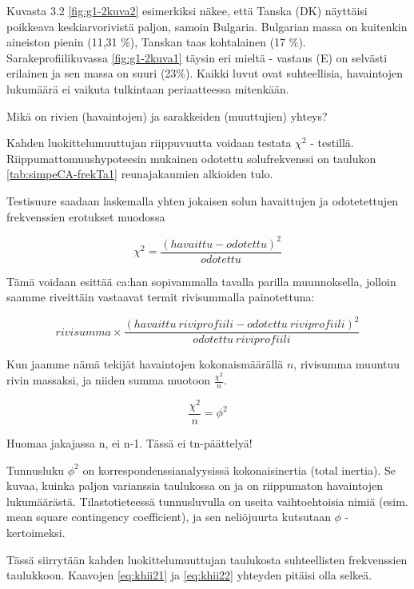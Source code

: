 \documentclass[
  finnish,
]{book}
\begin{document}
Kuvasta 3.2 \ref{fig:g1-2kuva2} esimerkiksi näkee, että Tanska (DK) näyttäisi
poikkeava keskiarvorivistä paljon, samoin Bulgaria.
Bulgarian massa on kuitenkin aineiston pienin (11,31 \%), Tanskan taas
kohtalainen (17 \%).
Sarakeprofiilikuvassa \ref{fig:g1-2kuva1} täysin eri mieltä - vastaus (E) on
selvästi erilainen ja sen massa on suuri (23\%). Kaikki luvut ovat suhteellisia,
havaintojen lukumäärä ei vaikuta tulkintaan periaatteessa mitenkään.

Mikä on rivien (havaintojen) ja sarakkeiden (muuttujien) yhteys?

Kahden luokittelumuuttujan riippuvuutta voidaan testata \(\chi^{2}\) - testillä.
Riippumattomuushypoteesin mukainen odotettu solufrekvenssi on taulukon
\ref{tab:simpeCA-frekTa1} reunajakaumien alkioiden tulo.

Testisuure saadaan laskemalla yhten jokaisen solun havaittujen ja odotetettujen
frekvenssien erotukset muodossa

\begin{equation}
  \chi^{2} = \frac{(havaittu - odotettu)^2} {odotettu}
    \label{eq:khii21}
\end{equation}

Tämä voidaan esittää ca:han sopivammalla tavalla parilla muunnoksella, jolloin
saamme riveittäin vastaavat termit rivisummalla painotettuna:

\begin{equation}
  rivisumma \times \frac{(havaittu \: riviprofiili - odotettu \: riviprofiili)^2} {odotettu \: riviprofiili}
    \label{eq:khii22}
\end{equation}

Kun jaamme nämä tekijät havaintojen kokonaismäärällä \(n\), rivisumma muuntuu
rivin massaksi, ja niiden summa muotoon \(\frac{\chi^{2}}{n}\).

\begin{equation}
 \frac{\chi^{2}}{n} = \phi^{2}
  \label{eq:inert1}
 \end{equation}

Huomaa jakajassa n, ei n-1. Tässä ei tn-päättelyä!

Tunnusluku \(\phi^{2}\) on korrespondenssianalyysissä kokonaisinertia (total
inertia). Se kuvaa, kuinka paljon varianssia taulukossa on ja on riippumaton
havaintojen lukumäärästä. Tilastotieteessä tunnusluvulla on useita vaihtoehtoisia
nimiä (esim. mean square contingency coefficient), ja sen neliöjuurta kutsutaan
\(\phi\) - kertoimeksi.

Tässä siirrytään kahden luokittelumuuttujan taulukosta suhteellisten frekvenssien
taulukkoon. Kaavojen \eqref{eq:khii21} ja \eqref{eq:khii22} yhteyden pitäisi olla
selkeä.
\end{document}

